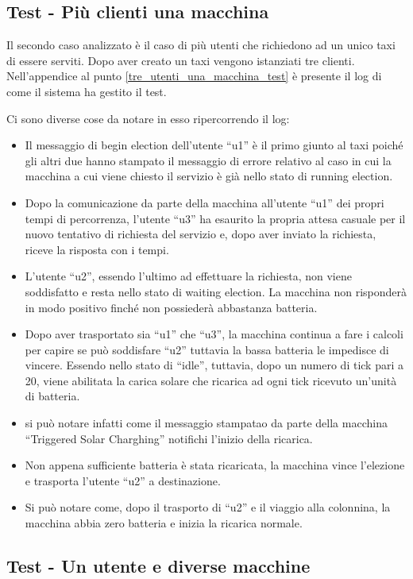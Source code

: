 \subsection{Test - Più clienti una macchina}
Il secondo caso analizzato è il caso di più utenti che richiedono ad un unico taxi di essere serviti. Dopo aver creato un taxi vengono istanziati tre clienti. Nell'appendice al punto \ref{tre_utenti_una_macchina_test} è presente il log di come il sistema ha gestito il test. 

Ci sono diverse cose da notare in esso ripercorrendo il log:
\begin{itemize}
	\item Il messaggio di begin election dell'utente ``u1'' è il primo giunto al taxi poiché gli altri due hanno stampato il messaggio di errore relativo al caso in cui la macchina a cui viene chiesto il servizio è già nello stato di running election.
	\item Dopo la comunicazione da parte della macchina all'utente ``u1'' dei propri tempi di percorrenza, l'utente ``u3'' ha esaurito la propria attesa casuale per il nuovo tentativo di richiesta del servizio e, dopo aver inviato la richiesta, riceve la risposta con i tempi. 
	\item L'utente ``u2'', essendo l'ultimo ad effettuare la richiesta, non viene soddisfatto e resta nello stato di waiting election. La macchina non risponderà in modo positivo finché non possiederà abbastanza batteria.
	\item Dopo aver trasportato sia ``u1'' che ``u3'', la macchina continua a fare i calcoli per capire se può soddisfare ``u2'' tuttavia la bassa batteria le impedisce di vincere. Essendo nello stato di ``idle'', tuttavia, dopo un numero di tick pari a 20, viene abilitata la carica solare che ricarica ad ogni tick ricevuto un'unità di batteria.
	\item si può notare infatti come il messaggio stampatao da parte della macchina ``Triggered Solar Charghing'' notifichi l'inizio della ricarica.
	\item Non appena sufficiente batteria è stata ricaricata, la macchina vince l'elezione e trasporta l'utente ``u2'' a destinazione.
	\item Si può notare come, dopo il trasporto di ``u2'' e il viaggio alla colonnina, la macchina abbia zero batteria e inizia la ricarica normale.
\end{itemize}

\subsection{Test - Un utente e diverse macchine}
